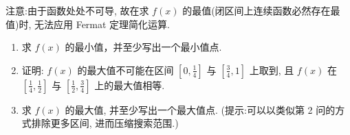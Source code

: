注意:由于函数处处不可导, 故在求 \(f(x)\) 的最值(闭区间上连续函数必然存在最值)时, 无法应用 Fermat 定理简化运算.

\begin{enumerate}
    \item[1.]求 \(f(x)\) 的最小值，并至少写出一个最小值点.
    \item[2.]证明: \(f(x)\) 的最大值不可能在区间 \(\displaystyle\left[0, \frac{1}{4}\right]\) 
    与 \(\displaystyle\left[\frac{3}{4}, 1\right]\) 上取到, 且 \(f(x)\) 在 
    \(\displaystyle\left[\frac{1}{4}, \frac{1}{2}\right]\) 与 \(\displaystyle\left[\frac{1}{2}, \frac{3}{4}\right]\) 上的最大值相等.
    \item[3.]求 \(f(x)\) 的最大值, 并至少写出一个最大值点. (提示:可以以类似第 2 问的方式排除更多区间, 进而压缩搜索范围.)
\end{enumerate}
